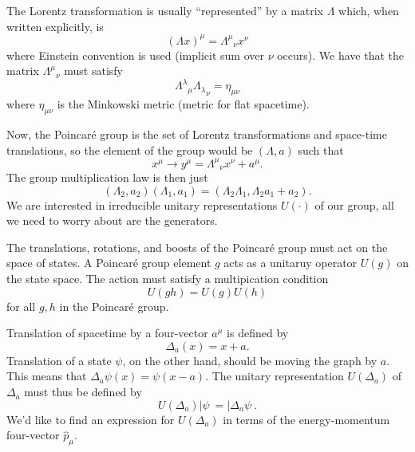 
The Lorentz transformation is usually ``represented'' by a matrix
$\Lambda$ which, when written explicitly, is
\begin{equation}%
(\Lambda x)^{\mu} = {\Lambda^{\mu}}_{\nu}x^{\nu}
\end{equation}
where Einstein convention is used (implicit sum over $\nu$
occurs). We have that the matrix ${\Lambda^{\mu}}_{\nu}$ must
satisfy
\begin{equation}%
{\Lambda^{\lambda}}_{\mu}{\Lambda_{\lambda}}_{\nu} = \eta_{\mu\nu}
\end{equation}
where $\eta_{\mu\nu}$ is the Minkowski metric (metric for flat
spacetime).

Now, the Poincar\'e group is the set of Lorentz transformations
and space-time translations, so the element of the group would be
$(\Lambda,a)$ such that
\begin{equation}%
x^{\mu}\to y^{\mu} = {\Lambda^{\mu}}_{\nu}x^{\nu}+a^{\mu}.
\end{equation}
The group multiplication law is then just
\begin{equation}%
(\Lambda_{2},a_{2})(\Lambda_{1},a_{1}) = (\Lambda_{2}\Lambda_{1},\Lambda_{2}a_{1}+a_{2}).
\end{equation}
We are interested in irreducible unitary representations $U(\cdot)$ of our
group, all we need to worry about are the generators.

The translations, rotations, and boosts of the Poincar\'e group
must act on the space of states. A Poincar\'e group element $g$
acts as a unitaruy operator $U(g)$ on the state space. The action
must satisfy a multipication condition
\begin{equation}%
U(gh)=U(g)U(h)
\end{equation}
for all $g,h$ in the Poincar\'e group.

Translation of spacetime by a four-vector $a^{\mu}$ is defined by
\begin{equation}%
\Delta_{a}(x) = x+a.
\end{equation}
Translation of a state $\psi$, on the other hand, should be
moving the graph by $a$. This means that
$\Delta_{a}\psi(x)=\psi(x-a)$. The unitary representation
$U(\Delta_{a})$ of $\Delta_{a}$ must thus be defined by
\begin{equation}%
U(\Delta_{a})|\psi\>=|\Delta_{a}\psi\>.
\end{equation}
We'd like to find an expression for $U(\Delta_a)$ in terms of the
energy-momentum four-vector $\widehat{p}_{\mu}$.


